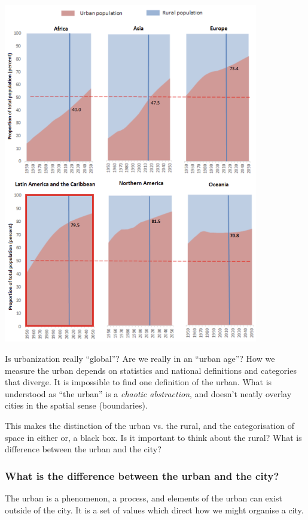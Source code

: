 \documentclass{article}
\begin{document}
\begin{center}
	\includegraphics[width=30em]{urban_rural_proportion}
\end{center}

Is urbanization really ``global''? Are we really in an ``urban age''? How we measure the urban depends on statistics and national definitions and categories that diverge. It is impossible to find one definition of the urban. What is understood as ``the urban'' is a \textit{chaotic abstraction}, and doesn't neatly overlay cities in the spatial sense (boundaries). 

This makes the distinction of the urban vs. the rural, and the categorisation of space in either or, a black box. Is it important to think about the rural? What is difference between the urban and the city?

\subsubsection{What is the difference between the urban and the city?}

The urban is a phenomenon, a process, and elements of the urban can exist outside of the city. 
It is a set of values which direct how we might organise a city.
\end{document}
